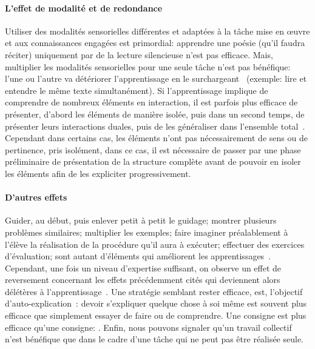             \paragraph{L’effet de modalité et de redondance}
                Utiliser des modalités sensorielles différentes et adaptées à la tâche mise en œuvre et aux connaissances engagées est primordial: apprendre une poésie (qu'il faudra réciter) uniquement par de la lecture silencieuse n'est pas efficace.
                Mais, multiplier les modalités sensorielles pour une seule tâche n'est pas bénéfique: l'une ou l'autre va détériorer l’apprentissage en le surchargeant~ (exemple: lire et entendre le même texte simultanément).
                Si l’apprentissage implique de comprendre de nombreux éléments en interaction, il est parfois plus efficace de présenter, d’abord les éléments de manière isolée, puis dans un second temps, de présenter leurs interactions duales, puis de les généraliser dans l’ensemble total~. Cependant dans certains cas, les éléments n'ont pas nécessairement de sens ou de pertinence, pris isolément, dans ce cas, il est nécessaire de passer par une phase préliminaire de présentation de la structure complète avant de pouvoir en isoler les éléments afin de les expliciter progressivement.
            \paragraph{D'autres effets}
                Guider, au début, puis enlever petit à petit le guidage; montrer plusieurs problèmes similaires; multiplier les exemples; faire imaginer préalablement à l'élève la réalisation de la procédure qu'il aura à exécuter; effectuer des exercices d'évaluation; sont autant d'éléments qui améliorent les apprentissages~. Cependant, une fois un niveau d'expertise suffisant, on observe un effet de reversement concernant les effets précédemment cités qui deviennent alors délétères à l'apprentissage~. Une stratégie semblant rester efficace, est, l'objectif d'auto-explication~: devoir s’expliquer quelque chose à soi même est souvent plus efficace que simplement essayer de faire ou de comprendre. Une consigne  est plus efficace qu'une consigne: .
                Enfin, nous pouvons signaler qu'un travail collectif n'est bénéfique que dans le cadre d'une tâche qui ne peut pas être réalisée seule.